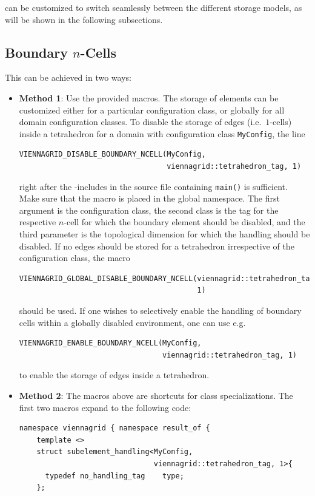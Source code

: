 
{\ViennaGrid} can be customized to switch seamlessly between the different storage models, as will be shown in the following subsections.

\subsection{Boundary $n$-Cells} \label{subsec:boundary-ncells-storage}

This can be achieved in two ways:
\begin{itemize}
 \item \textbf{Method 1}: Use the provided macros. The storage of elements can be customized either for a particular configuration class, or globally for all domain configuration classes. To disable the storage of edges (i.e.~$1$-cells) inside a tetrahedron for a domain with configuration class \lstinline|MyConfig|, the line
  \begin{lstlisting}
VIENNAGRID_DISABLE_BOUNDARY_NCELL(MyConfig,
                                  viennagrid::tetrahedron_tag, 1)
  \end{lstlisting}
right after the {\ViennaGrid}-includes in the source file containing \lstinline|main()| is sufficient. Make sure that the macro is placed in the global namespace. The first argument is the configuration class, the second class is the tag for the respective $n$-cell for which the boundary element should be disabled, and the third parameter is the topological dimension for which the handling should be disabled.
 If no edges should be stored for a tetrahedron irrespective of the configuration class, the macro
  \begin{lstlisting}
VIENNAGRID_GLOBAL_DISABLE_BOUNDARY_NCELL(viennagrid::tetrahedron_tag,
                                         1)
  \end{lstlisting}
 should be used. If one wishes to selectively enable the handling of boundary cells within a globally disabled environment, one can use e.g.
  \begin{lstlisting}
VIENNAGRID_ENABLE_BOUNDARY_NCELL(MyConfig,
                                 viennagrid::tetrahedron_tag, 1)
  \end{lstlisting}
 to enable the storage of edges inside a tetrahedron.

 \item \textbf{Method 2}: The macros above are shortcuts for class specializations. The first two macros expand to the following code:
\begin{lstlisting}
namespace viennagrid { namespace result_of {
    template <>
    struct subelement_handling<MyConfig,
                               viennagrid::tetrahedron_tag, 1>{
      typedef no_handling_tag    type;
    };


\end{lstlisting}
\end{itemize}
